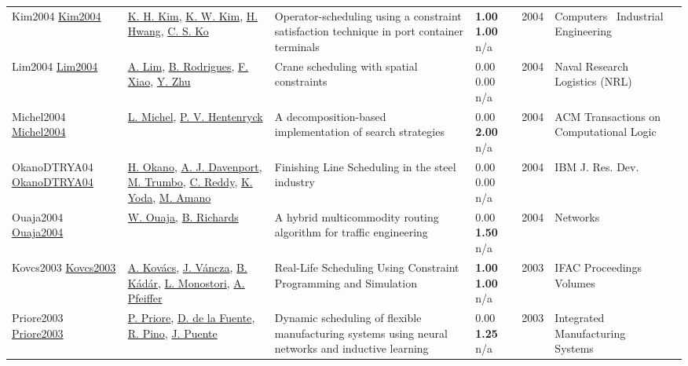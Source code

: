 {\begin{longtable}{p{3cm}p{5cm}p{10cm}p{1cm}rp{2.5cm}l}
Kim2004 \href{http://dx.doi.org/10.1016/j.cie.2003.12.017}{Kim2004} & \hyperref[auth:a2029]{K. H. Kim}, \hyperref[auth:a2030]{K. W. Kim}, \hyperref[auth:a2031]{H. Hwang}, \hyperref[auth:a2032]{C. S. Ko} & Operator-scheduling using a constraint satisfaction technique in port container terminals & \noindent{}\textbf{1.00} \textbf{1.00} n/a & 2004 & Computers \  Industrial Engineering & \cite{Kim2004}\\
Lim2004 \href{http://dx.doi.org/10.1002/nav.10123}{Lim2004} & \hyperref[auth:a279]{A. Lim}, \hyperref[auth:a280]{B. Rodrigues}, \hyperref[auth:a1743]{F. Xiao}, \hyperref[auth:a1744]{Y. Zhu} & Crane scheduling with spatial constraints & \noindent{}\textcolor{black!50}{0.00} \textcolor{black!50}{0.00} n/a & 2004 & Naval Research Logistics (NRL) & \cite{Lim2004}\\
Michel2004 \href{http://dx.doi.org/10.1145/976706.976714}{Michel2004} & \hyperref[auth:a32]{L. Michel}, \hyperref[auth:a148]{P. V. Hentenryck} & A decomposition-based implementation of search strategies & \noindent{}\textcolor{black!50}{0.00} \textbf{2.00} n/a & 2004 & ACM Transactions on Computational Logic & \cite{Michel2004}\\
OkanoDTRYA04 \href{https://doi.org/10.1147/rd.485.0811}{OkanoDTRYA04} & \hyperref[auth:a1288]{H. Okano}, \hyperref[auth:a248]{A. J. Davenport}, \hyperref[auth:a1289]{M. Trumbo}, \hyperref[auth:a250]{C. Reddy}, \hyperref[auth:a1290]{K. Yoda}, \hyperref[auth:a1291]{M. Amano} & Finishing Line Scheduling in the steel industry & \noindent{}\textcolor{black!50}{0.00} \textcolor{black!50}{0.00} n/a & 2004 & {IBM} J. Res. Dev. & \cite{OkanoDTRYA04}\\
Ouaja2004 \href{http://dx.doi.org/10.1002/net.10110}{Ouaja2004} & \hyperref[auth:a1548]{W. Ouaja}, \hyperref[auth:a1549]{B. Richards} & \cellcolor{gold!20}A hybrid multicommodity routing algorithm for traffic engineering & \noindent{}\textcolor{black!50}{0.00} \textbf{1.50} n/a & 2004 & Networks & \cite{Ouaja2004}\\
Kovcs2003 \href{http://dx.doi.org/10.1016/s1474-6670(17)37762-5}{Kovcs2003} & \hyperref[auth:a1880]{A. Kovács}, \hyperref[auth:a1881]{J. Váncza}, \hyperref[auth:a1882]{B. Kádár}, \hyperref[auth:a1883]{L. Monostori}, \hyperref[auth:a1884]{A. Pfeiffer} & Real-Life Scheduling Using Constraint Programming and Simulation & \noindent{}\textbf{1.00} \textbf{1.00} n/a & 2003 & IFAC Proceedings Volumes & \cite{Kovcs2003}\\
Priore2003 \href{http://dx.doi.org/10.1108/09576060310459456}{Priore2003} & \hyperref[auth:a1819]{P. Priore}, \hyperref[auth:a1820]{D. de la Fuente}, \hyperref[auth:a1821]{R. Pino}, \hyperref[auth:a1822]{J. Puente} & Dynamic scheduling of flexible manufacturing systems using neural networks and inductive learning & \noindent{}\textcolor{black!50}{0.00} \textbf{1.25} n/a & 2003 & Integrated Manufacturing Systems & \cite{Priore2003}\\

\end{longtable}}
